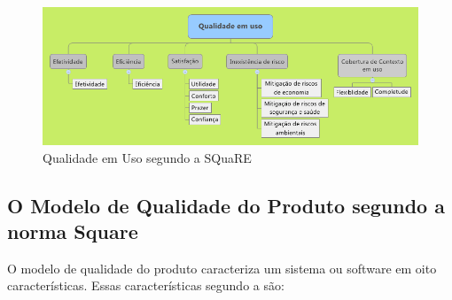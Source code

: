 \begin{figure}[!ht]
\centering
\includegraphics[keepaspectratio=true,scale=0.6]{figuras/QualidadeUso.png}
\caption{Qualidade em Uso segundo a SQuaRE \cite{iso_25010}}
\label{Qualidade_uso}
\end{figure}

\subsection{O Modelo de Qualidade do Produto segundo a norma Square}

O modelo de qualidade do produto caracteriza um sistema ou software em oito características. Essas características segundo a   são:


